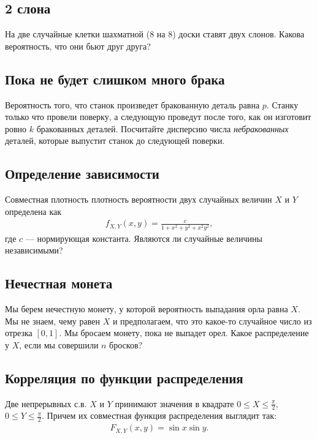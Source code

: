 \documentclass[12pt]{article}
\begin{document}
\subsection{2 слона}

На две случайные клетки шахматной (8 на 8) доски ставят двух слонов. Какова вероятность, что они бьют друг друга?



\subsection{Пока не будет слишком много брака}

Вероятность того, что станок произведет бракованную деталь равна $p$. Станку только что провели поверку, а следующую проведут после того, как он изготовит ровно $k$ бракованных деталей. Посчитайте дисперсию числа \emph{небракованных} деталей, которые выпустит станок до следующей поверки.



\subsection{Определение зависимости}

Совместная плотность плотность вероятности двух случайных величин $X$ и $Y$ определена как
\begin{align*}
    f_{X, Y}(x, y) = \frac{c}{1 + x^2 + y^2 + x^2y^2},
\end{align*}
где $c$ --- нормирующая константа. Являются ли случайные величины независимыми?



\subsection{Нечестная монета}

Мы берем нечестную монету, у которой вероятность выпадания орла равна $X$. Мы не знаем, чему равен $X$ и предполагаем, что это какое-то случайное число из отрезка $[0, 1]$. Мы бросаем монету, пока не выпадет орел. Какое распределение у $X$, если мы совершили $n$ бросков?



\subsection{Корреляция по функции распределения}

Две непрерывных с.в. $X$ и $Y$ принимают значения в квадрате $0 \le X \le \frac{\pi}{2},$ $0 \le Y \le \frac{\pi}{2}$. Причем их совместная функция распределения выглядит так:
\begin{align*}
    F_{X, Y} (x, y) = \sin x \sin y.
\end{align*}
\end{document}
